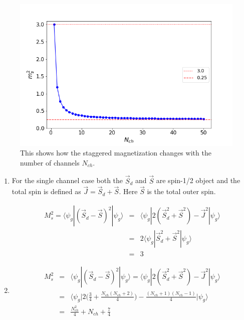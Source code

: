\documentclass[reprint,prb,superscriptaddress]{revtex4-1}
\begin{document}
\begin{figure}
\includegraphics[scale=0.36]{plt/Staggered_mag_50.png}
\caption{This shows how the staggered magnetization changes with the number of channels $N_{ch}$.}
\label{fig:st_mag}
\end{figure}

\begin{enumerate}
\item For the single channel case both the $\vec{S}_d$ and $\vec{S}$ are spin-1/2 object and the total spin is defined as $\vec{J}=\vec{S}_d+\vec{S}$. Here $\vec{S}$ is the total outer spin.

\begin{eqnarray}
M_s^2 = \langle \psi_g | (\vec{S}_d - \vec{S})^2 |\psi_g\rangle &=& \langle \psi_g | 2(\vec{S}_d^2 + \vec{S}^2)-\vec{J}^2 |\psi_g\rangle \nonumber\\
&=& 2 \langle \psi_g | \vec{S}_d^2 +\vec{S}^2 |\psi_g\rangle \nonumber\\
&=& 3
\end{eqnarray}

\item \begin{eqnarray}
M_s^2 &=& \langle \psi_g | (\vec{S}_d - \vec{S})^2 |\psi_g\rangle = \langle \psi_g | 2(\vec{S}_d^2 + \vec{S}^2)-\vec{J}^2 |\psi_g\rangle \nonumber\\
&=&  \bigg\langle \psi_g \bigg| 2\bigg(\frac{3}{4}+ \frac{N_{ch}(N_{ch}+2)}{4}\bigg)- \frac{(N_{ch}+1)(N_{ch}-1)}{4} \bigg|\psi_g \bigg\rangle \nonumber\\
&=& \frac{N_{ch}^2}{4}+N_{ch}+\frac{7}{4}
\end{eqnarray}

\end{enumerate}
\end{document}
